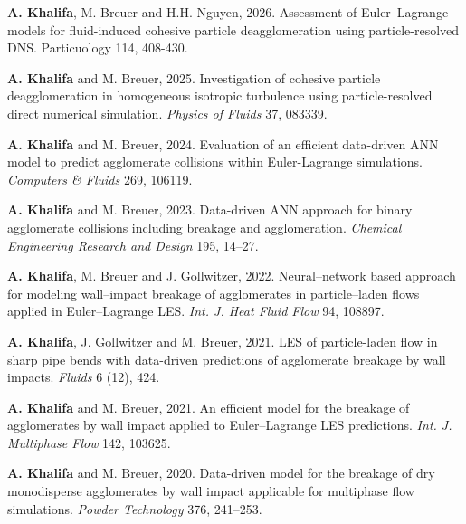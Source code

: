 
\item \textbf{A. Khalifa}, M. Breuer and H.H. Nguyen, 2026. Assessment of Euler–Lagrange models for fluid-induced cohesive particle deagglomeration using particle-resolved DNS. Particuology 114, 408-430. 
\item \textbf{A. Khalifa} and M. Breuer, 2025. Investigation of cohesive particle deagglomeration in homogeneous isotropic turbulence using particle-resolved direct numerical simulation. \textit{Physics of Fluids} 37, 083339. 
\item \textbf{A. Khalifa} and M. Breuer, 2024. Evaluation of an efficient data-driven ANN model to predict agglomerate collisions within Euler-Lagrange simulations. \textit{Computers \& Fluids} 269, 106119. 
\item \textbf{A. Khalifa} and M. Breuer, 2023. Data-driven ANN approach for binary agglomerate collisions including breakage and agglomeration. \textit{Chemical Engineering Research and Design} 195, 14--27. 
\item \textbf{A. Khalifa}, M. Breuer and J. Gollwitzer, 2022. Neural--network based approach for modeling wall--impact breakage of agglomerates in particle--laden flows applied in Euler--Lagrange LES. \textit{Int. J. Heat Fluid Flow} 94, 108897. 
\item \textbf{A. Khalifa}, J. Gollwitzer and M. Breuer, 2021. LES of particle-laden flow in sharp pipe bends with data-driven predictions of agglomerate breakage by wall impacts. \textit{Fluids} 6 (12), 424. 
\item \textbf{A. Khalifa} and M. Breuer, 2021. An efficient model for the breakage of agglomerates by wall impact applied to Euler--Lagrange LES predictions. \textit{Int. J. Multiphase Flow} 142, 103625. 
\item \textbf{A. Khalifa} and M. Breuer, 2020. Data-driven model for the breakage of dry monodisperse agglomerates by wall impact applicable for multiphase flow simulations. \textit{Powder Technology} 376, 241--253. 
